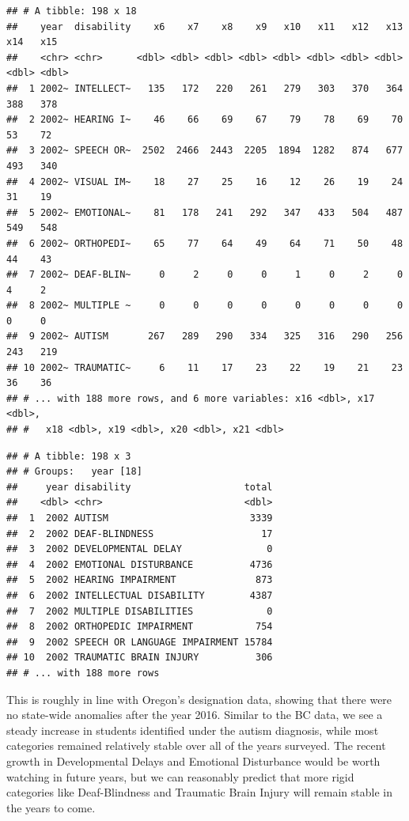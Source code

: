 \documentclass[
  english,
  man,floatsintext]{apa6}
\begin{document}
\begin{verbatim}
## # A tibble: 198 x 18
##    year  disability    x6    x7    x8    x9   x10   x11   x12   x13   x14   x15
##    <chr> <chr>      <dbl> <dbl> <dbl> <dbl> <dbl> <dbl> <dbl> <dbl> <dbl> <dbl>
##  1 2002~ INTELLECT~   135   172   220   261   279   303   370   364   388   378
##  2 2002~ HEARING I~    46    66    69    67    79    78    69    70    53    72
##  3 2002~ SPEECH OR~  2502  2466  2443  2205  1894  1282   874   677   493   340
##  4 2002~ VISUAL IM~    18    27    25    16    12    26    19    24    31    19
##  5 2002~ EMOTIONAL~    81   178   241   292   347   433   504   487   549   548
##  6 2002~ ORTHOPEDI~    65    77    64    49    64    71    50    48    44    43
##  7 2002~ DEAF-BLIN~     0     2     0     0     1     0     2     0     4     2
##  8 2002~ MULTIPLE ~     0     0     0     0     0     0     0     0     0     0
##  9 2002~ AUTISM       267   289   290   334   325   316   290   256   243   219
## 10 2002~ TRAUMATIC~     6    11    17    23    22    19    21    23    36    36
## # ... with 188 more rows, and 6 more variables: x16 <dbl>, x17 <dbl>,
## #   x18 <dbl>, x19 <dbl>, x20 <dbl>, x21 <dbl>
\end{verbatim}

\begin{verbatim}
## # A tibble: 198 x 3
## # Groups:   year [18]
##     year disability                    total
##    <dbl> <chr>                         <dbl>
##  1  2002 AUTISM                         3339
##  2  2002 DEAF-BLINDNESS                   17
##  3  2002 DEVELOPMENTAL DELAY               0
##  4  2002 EMOTIONAL DISTURBANCE          4736
##  5  2002 HEARING IMPAIRMENT              873
##  6  2002 INTELLECTUAL DISABILITY        4387
##  7  2002 MULTIPLE DISABILITIES             0
##  8  2002 ORTHOPEDIC IMPAIRMENT           754
##  9  2002 SPEECH OR LANGUAGE IMPAIRMENT 15784
## 10  2002 TRAUMATIC BRAIN INJURY          306
## # ... with 188 more rows
\end{verbatim}

This is roughly in line with Oregon's designation data, showing that there were no state-wide anomalies after the year 2016. Similar to the BC data, we see a steady increase in students identified under the autism diagnosis, while most categories remained relatively stable over all of the years surveyed. The recent growth in Developmental Delays and Emotional Disturbance would be worth watching in future years, but we can reasonably predict that more rigid categories like Deaf-Blindness and Traumatic Brain Injury will remain stable in the years to come.
\end{document}
